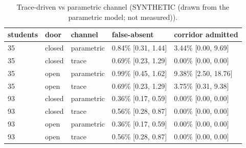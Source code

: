 \begin{table}[t]
\centering
\caption{Trace-driven vs parametric channel (SYNTHETIC (drawn from the parametric model; not measured)).}\label{tab:e13}
\begin{tabular}{lllll}
\toprule
students & door & channel & false-absent & corridor admitted \\
\midrule
35 & closed & parametric & 0.84\% [0.31, 1.44] & 3.44\% [0.00, 9.69] \\
35 & closed & trace & 0.69\% [0.23, 1.29] & 0.00\% [0.00, 0.00] \\
35 & open & parametric & 0.99\% [0.45, 1.62] & 9.38\% [2.50, 18.76] \\
35 & open & trace & 0.69\% [0.23, 1.29] & 3.75\% [0.31, 9.38] \\
93 & closed & parametric & 0.36\% [0.17, 0.59] & 0.00\% [0.00, 0.00] \\
93 & closed & trace & 0.56\% [0.28, 0.87] & 0.00\% [0.00, 0.00] \\
93 & open & parametric & 0.36\% [0.17, 0.59] & 0.00\% [0.00, 0.00] \\
93 & open & trace & 0.56\% [0.28, 0.87] & 0.00\% [0.00, 0.00] \\
\bottomrule
\end{tabular}
\end{table}
